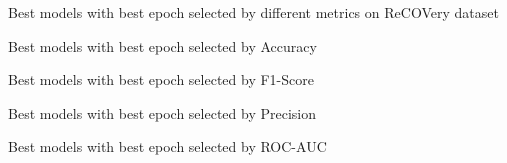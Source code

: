 \begin{table}[!htbp]
    \caption{Best models with best epoch selected by different metrics on ReCOVery dataset}
    \label{tab:recovery_best_models}
    \centering

    \begin{subtable}[t]{\linewidth}
        \footnotesize
        \caption{Best models with best epoch selected by Accuracy}
        
    \end{subtable}

    \vspace{1em}

    \begin{subtable}[t]{\linewidth}
        \footnotesize
        \caption{Best models with best epoch selected by F1-Score}
        
    \end{subtable}

    \vspace{1em}

    \begin{subtable}[t]{\linewidth}
        \footnotesize
        \caption{Best models with best epoch selected by Precision}
        
    \end{subtable}


    \vspace{1em}

    \begin{subtable}[t]{\linewidth}
        \footnotesize
        \caption{Best models with best epoch selected by ROC-AUC}
        
    \end{subtable}



\end{table}